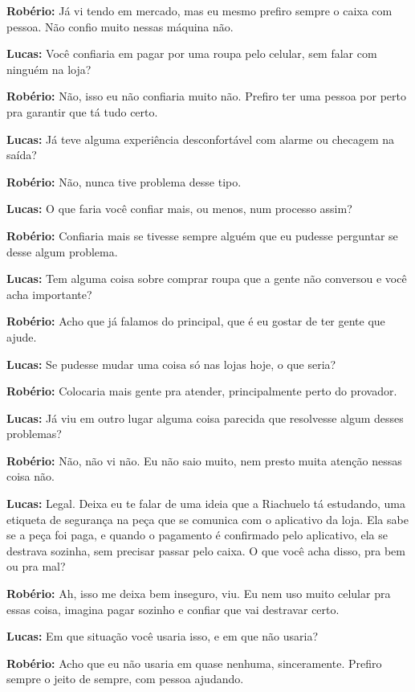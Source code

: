 \textbf{Robério:} Já vi tendo em mercado, mas eu mesmo prefiro sempre o caixa com pessoa. Não confio muito nessas máquina não.

\textbf{Lucas:} Você confiaria em pagar por uma roupa pelo celular, sem falar com ninguém na loja?

\textbf{Robério:} Não, isso eu não confiaria muito não. Prefiro ter uma pessoa por perto pra garantir que tá tudo certo.

\textbf{Lucas:} Já teve alguma experiência desconfortável com alarme ou checagem na saída?

\textbf{Robério:} Não, nunca tive problema desse tipo.

\textbf{Lucas:} O que faria você confiar mais, ou menos, num processo assim?

\textbf{Robério:} Confiaria mais se tivesse sempre alguém que eu pudesse perguntar se desse algum problema.

\textbf{Lucas:} Tem alguma coisa sobre comprar roupa que a gente não conversou e você acha importante?

\textbf{Robério:} Acho que já falamos do principal, que é eu gostar de ter gente que ajude.

\textbf{Lucas:} Se pudesse mudar uma coisa só nas lojas hoje, o que seria?

\textbf{Robério:} Colocaria mais gente pra atender, principalmente perto do provador.

\textbf{Lucas:} Já viu em outro lugar alguma coisa parecida que resolvesse algum desses problemas?

\textbf{Robério:} Não, não vi não. Eu não saio muito, nem presto muita atenção nessas coisa não.

\textbf{Lucas:} Legal. Deixa eu te falar de uma ideia que a Riachuelo tá estudando, uma etiqueta de segurança na peça que se comunica com o aplicativo da loja. Ela sabe se a peça foi paga, e quando o pagamento é confirmado pelo aplicativo, ela se destrava sozinha, sem precisar passar pelo caixa. O que você acha disso, pra bem ou pra mal?

\textbf{Robério:} Ah, isso me deixa bem inseguro, viu. Eu nem uso muito celular pra essas coisa, imagina pagar sozinho e confiar que vai destravar certo.

\textbf{Lucas:} Em que situação você usaria isso, e em que não usaria?

\textbf{Robério:} Acho que eu não usaria em quase nenhuma, sinceramente. Prefiro sempre o jeito de sempre, com pessoa ajudando.

